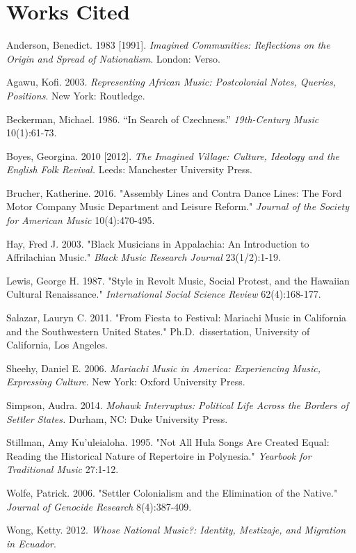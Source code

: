 \documentclass[twoside]{article}
\begin{document}
\bigskip
\hypertarget{works-cited}{%
\section*{Works Cited}\label{works-cited}}

\begin{hangparas}{15pt}{1}
  Anderson, Benedict. 1983 {[}1991{]}. \emph{Imagined
  Communities: Reflections on the Origin and Spread of Nationalism}.
  London: Verso.

  Agawu, Kofi. 2003. \emph{Representing African Music:
  Postcolonial Notes, Queries, Positions}. New York: Routledge.

  Beckerman, Michael. 1986. ``In Search of Czechness.''
  \emph{19th-Century Music} 10(1):61-73.

  Boyes, Georgina. 2010 {[}2012{]}. \emph{The Imagined Village:
  Culture, Ideology and the English Folk Revival.} Leeds: Manchester
  University Press.

  Brucher, Katherine. 2016. "Assembly Lines and Contra Dance
  Lines: The Ford Motor Company Music Department and Leisure Reform."
  \emph{Journal of the Society for American Music} 10(4):470-495.

  Hay, Fred J. 2003. "Black Musicians in Appalachia: An
  Introduction to Affrilachian Music." \emph{Black Music Research Journal}
  23(1/2):1-19.

  Lewis, George H. 1987. "Style in Revolt Music, Social
  Protest, and the Hawaiian Cultural Renaissance." \emph{International
  Social Science Review} 62(4):168-177.

  Salazar, Lauryn C. 2011. "From Fiesta to Festival: Mariachi
  Music in California and the Southwestern United States."
  Ph.D.~dissertation, University of California, Los Angeles.

  Sheehy, Daniel E. 2006. \emph{Mariachi Music in America:
  Experiencing Music, Expressing Culture}. New York: Oxford University
  Press.

  Simpson, Audra. 2014. \emph{Mohawk Interruptus: Political
  Life Across the Borders of Settler States.} Durham, NC: Duke University
  Press.

  Stillman, Amy Ku'uleialoha. 1995. "Not All Hula Songs Are
  Created Equal: Reading the Historical Nature of Repertoire in
  Polynesia." \emph{Yearbook for Traditional Music} 27:1-12.

  Wolfe, Patrick. 2006. "Settler Colonialism and the
  Elimination of the Native." \emph{Journal of Genocide Research}
  8(4):387-409.

  Wong, Ketty. 2012. \emph{Whose National Music?: Identity,
  Mestizaje, and Migration in Ecuador}.
\end{hangparas}
\end{document}
